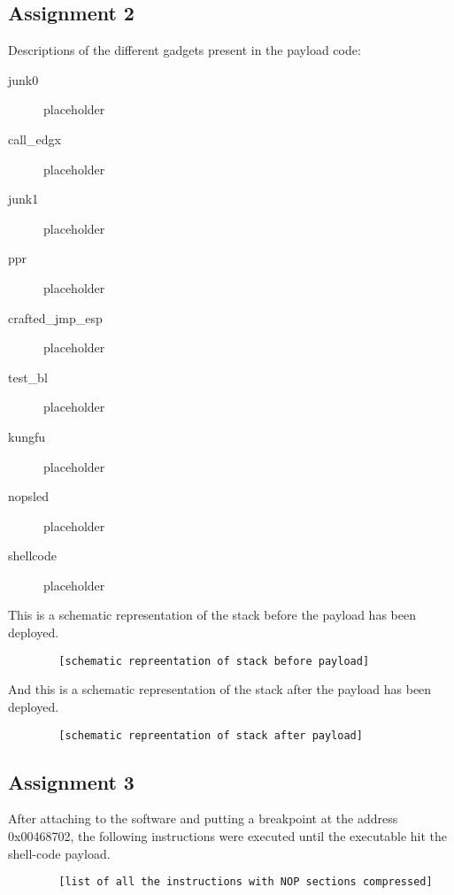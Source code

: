 \documentclass[10pt]{article}
\begin{document}
    \subsection{Assignment 2}

      Descriptions of the different gadgets present in the payload code:

      \begin{description}
        \item[junk0]{placeholder}
        \item[call\_edgx]{placeholder}
        \item[junk1]{placeholder}
        \item[ppr]{placeholder}
        \item[crafted\_jmp\_esp]{placeholder}
        \item[test\_bl]{placeholder}
        \item[kungfu]{placeholder}
        \item[nopsled]{placeholder}
        \item[shellcode]{placeholder}
      \end{description}

      This is a schematic representation of the stack before the payload has
      been deployed.

      \begin{verbatim}
        [schematic repreentation of stack before payload]
      \end{verbatim}

      

      And this is a schematic representation of the stack after the payload
      has been deployed.

      \begin{verbatim}
        [schematic repreentation of stack after payload]
      \end{verbatim}

    \subsection{Assignment 3}

      After attaching to the software and putting a breakpoint at the address
      0x00468702, the following instructions were executed until the executable
      hit the shell-code payload.

      \begin{verbatim}
        [list of all the instructions with NOP sections compressed]
      \end{verbatim}
\end{document}
